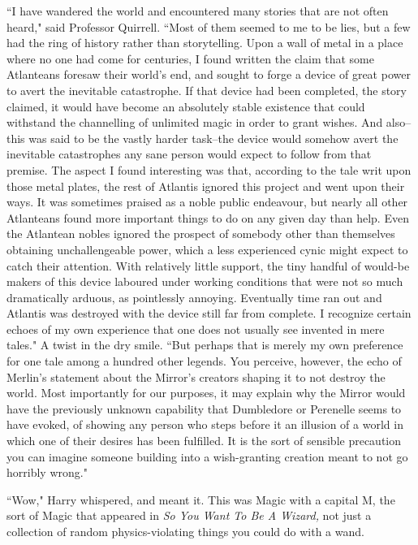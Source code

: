 ``I have wandered the world and encountered many stories that are not often heard," said Professor Quirrell. ``Most of them seemed to me to be lies, but a few had the ring of history rather than storytelling. Upon a wall of metal in a place where no one had come for centuries, I found written the claim that some Atlanteans foresaw their world's end, and sought to forge a device of great power to avert the inevitable catastrophe. If that device had been completed, the story claimed, it would have become an absolutely stable existence that could withstand the channelling of unlimited magic in order to grant wishes. And also\---this was said to be the vastly harder task\---the device would somehow avert the inevitable catastrophes any sane person would expect to follow from that premise. The aspect I found interesting was that, according to the tale writ upon those metal plates, the rest of Atlantis ignored this project and went upon their ways. It was sometimes praised as a noble public endeavour, but nearly all other Atlanteans found more important things to do on any given day than help. Even the Atlantean nobles ignored the prospect of somebody other than themselves obtaining unchallengeable power, which a less experienced cynic might expect to catch their attention. With relatively little support, the tiny handful of would-be makers of this device laboured under working conditions that were not so much dramatically arduous, as pointlessly annoying. Eventually time ran out and Atlantis was destroyed with the device still far from complete. I recognize certain echoes of my own experience that one does not usually see invented in mere tales." A twist in the dry smile. ``But perhaps that is merely my own preference for one tale among a hundred other legends. You perceive, however, the echo of Merlin's statement about the Mirror's creators shaping it to not destroy the world. Most importantly for our purposes, it may explain why the Mirror would have the previously unknown capability that Dumbledore or Perenelle seems to have evoked, of showing any person who steps before it an illusion of a world in which one of their desires has been fulfilled. It is the sort of sensible precaution you can imagine someone building into a wish-granting creation meant to not go horribly wrong."

``Wow," Harry whispered, and meant it. This was Magic with a capital M, the sort of Magic that appeared in \emph{So You Want To Be A Wizard,} not just a collection of random physics-violating things you could do with a wand.

